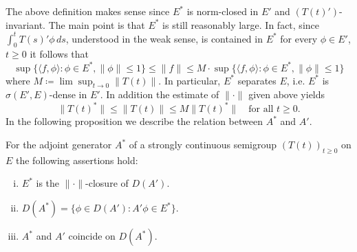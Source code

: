 The above definition makes sense since $E^{*}$ is norm-closed in $E'$ and $(T(t)')$-invariant.
The main point is that $E^{*}$ is still reasonably large.
In fact, since $\int_{0}^{t} T(s)'\phi \,ds$, understood in the weak sense, is contained in $E^{*}$ for every $\phi \in E'$, $t \geq 0$ it follows that
\[
    \sup\{\langle f,\phi \rangle : \phi \in E^{*}, \|\phi\| \leq 1\} \leq \|f\| \leq M\cdot\sup\{\langle f,\phi \rangle : \phi \in E^{*}, \|\phi\| \leq1\}
\]
where $M \coloneqq \lim\sup_{t \to 0} \|T(t)\|$.
In particular, $E^{*}$ separates $E$, i.e. $E^{*}$ is $\sigma(E',E)$-dense in $E'$.
In addition the estimate of $\|\cdot\|$ given above yields
\[
    \|T(t)^{*}\| \leq \|T(t)\| \leq M\|T(t)^{*}\| \quad \text{for all } t \geq 0.
\]
In the following proposition we describe the relation between $A^{*}$ and $A'$.
\begin{proposition}\label{prop:a1-3.1}
For the adjoint generator $A^{*}$ of a strongly continuous semigroup $(T(t))_{t \geq 0}$ on $E$ the following assertions hold:
\begin{enumerate}[(i)]
\item 
$E^{*}$ is the $\|\cdot\|$-closure of $D(A')$.

\item 
$D(A^{*}) = \{\phi \in D(A') : A'\phi \in E^{*}\}$.

\item 
$A^{*}$ and $A'$ coincide on $D(A^{*})$.
\end{enumerate}

\end{proposition}
